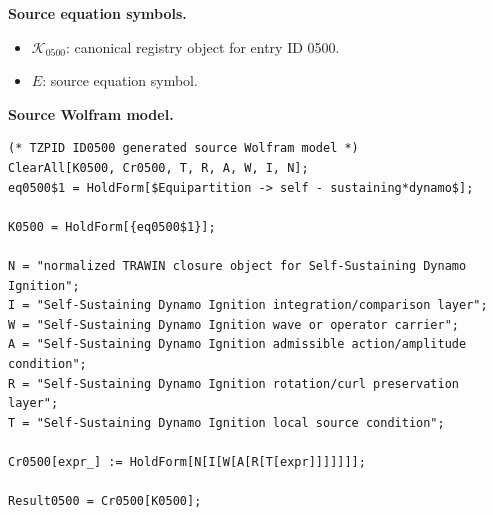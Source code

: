 \begin{minipage}[t]{0.49\linewidth}
\begingroup
\small
\raggedright
\textbf{Source equation symbols.}\par
\begin{itemize}[leftmargin=1.35em,itemsep=1pt,topsep=1pt,parsep=0pt]
    \item $\mathcal{K}_{0500}$: canonical registry object for entry ID 0500.
    \item $E$: source equation symbol.
\end{itemize}
\endgroup
\end{minipage}\hfill
\begin{minipage}[t]{0.47\linewidth}
\begingroup
\scriptsize
\raggedright
\textbf{Source Wolfram model.}\par
\begin{Verbatim}[fontsize=\tiny,breaklines=true,breakanywhere=true]
(* TZPID ID0500 generated source Wolfram model *)
ClearAll[K0500, Cr0500, T, R, A, W, I, N];
eq0500$1 = HoldForm[$Equipartition -> self - sustaining*dynamo$];

K0500 = HoldForm[{eq0500$1}];

N = "normalized TRAWIN closure object for Self-Sustaining Dynamo Ignition";
I = "Self-Sustaining Dynamo Ignition integration/comparison layer";
W = "Self-Sustaining Dynamo Ignition wave or operator carrier";
A = "Self-Sustaining Dynamo Ignition admissible action/amplitude condition";
R = "Self-Sustaining Dynamo Ignition rotation/curl preservation layer";
T = "Self-Sustaining Dynamo Ignition local source condition";

Cr0500[expr_] := HoldForm[N[I[W[A[R[T[expr]]]]]]];

Result0500 = Cr0500[K0500];
\end{Verbatim}
\endgroup
\end{minipage}

